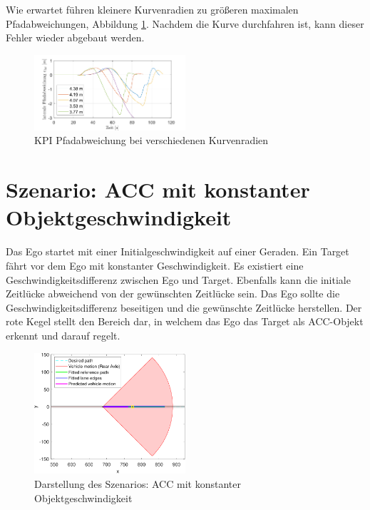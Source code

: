 \noindent Wie erwartet führen kleinere Kurvenradien zu größeren maximalen Pfadabweichungen, Abbildung \ref{fig:Curve_negative_s-Error}. Nachdem die Kurve durchfahren ist, kann dieser Fehler wieder abgebaut werden.
\begin{figure}[H]
    \centering
    \includegraphics[width=0.5\textwidth]{figures/3_Implementierung/Curve_negative/Curve_negative_s-Error.pdf}
    \caption{KPI Pfadabweichung bei verschiedenen Kurvenradien}
    \label{fig:Curve_negative_s-Error}
\end{figure}

\section{Szenario: ACC mit konstanter Objektgeschwindigkeit} \label{sec:acc_vel_const}
Das Ego startet mit einer Initialgeschwindigkeit auf einer Geraden. Ein Target fährt vor dem Ego mit konstanter Geschwindigkeit. Es existiert eine Geschwindigkeitsdifferenz zwischen Ego und Target. Ebenfalls kann die initiale Zeitlücke abweichend von der gewünschten Zeitlücke sein. Das Ego sollte die Geschwindigkeitsdifferenz beseitigen und die gewünschte Zeitlücke herstellen. Der rote Kegel stellt den Bereich dar, in welchem das Ego das Target als ACC-Objekt erkennt und darauf regelt. 
\begin{figure}[ht]
    \centering
    \includegraphics[width=0.5\textwidth]{figures/3_Implementierung/ACC_Vel_Const/test_ACC_Vel_Const_depiction.pdf}
    \caption{Darstellung des Szenarios: ACC mit konstanter Objektgeschwindigkeit}
    \label{fig:test_ACC_Vel_Const_depiction}
\end{figure}

